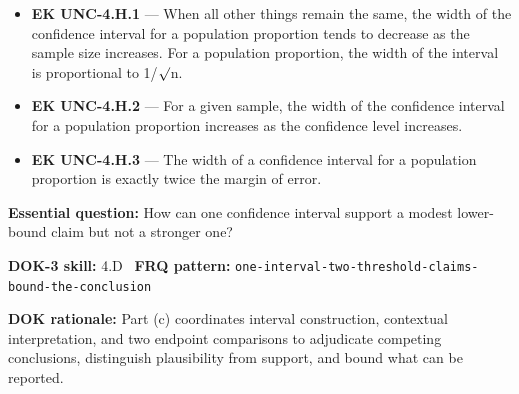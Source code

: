 \documentclass[11pt]{article}
\begin{document}
{\begin{itemize}[leftmargin=1.5em,itemsep=2pt,topsep=2pt]
  \item \textbf{EK UNC-4.H.1} --- When all other things remain the same, the width of the confidence interval for a population proportion tends to decrease as the sample size increases. For a population proportion, the width of the interval is proportional to 1/$\surd$n.
  \item \textbf{EK UNC-4.H.2} --- For a given sample, the width of the confidence interval for a population proportion increases as the confidence level increases.
  \item \textbf{EK UNC-4.H.3} --- The width of a confidence interval for a population proportion is exactly twice the margin of error.
\end{itemize}
}
\textbf{Essential question:} How can one confidence interval support a modest lower-bound claim but not a stronger one?\par
\textbf{DOK-3 skill:} 4.D \textperiodcentered\ \textbf{FRQ pattern:} {\small\texttt{one-\allowbreak{}interval-\allowbreak{}two-\allowbreak{}threshold-\allowbreak{}claims-\allowbreak{}bound-\allowbreak{}the-\allowbreak{}conclusion}}\par
\textbf{DOK rationale:} Part (c) coordinates interval construction, contextual interpretation, and two endpoint comparisons to adjudicate competing conclusions, distinguish plausibility from support, and bound what can be reported.\par

\end{document}

